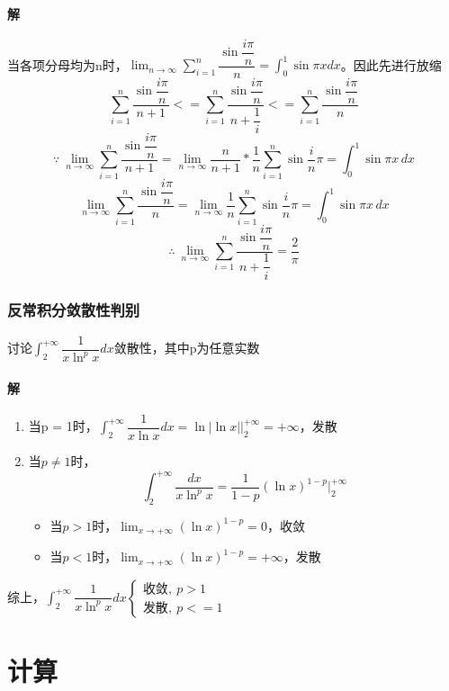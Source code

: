 \paragraph{解}
当各项分母均为n时，\(\displaystyle\lim_{n \to \infty}\sum_{i = 1}^n\dfrac{\sin\dfrac{i\pi}{n}}{n} = \int_0^1\sin\pi xdx\)。因此先进行放缩
\[\sum_{i = 1}^n\dfrac{\sin\dfrac{i\pi}{n}}{n + 1} <= \sum_{i = 1}^n\dfrac{\sin\dfrac{i\pi}{n}}{n + \dfrac{1}{i}} <= \sum_{i = 1}^n\dfrac{\sin\dfrac{i\pi}{n}}{n}\]
\[\because\ \lim_{n \to \infty}\sum_{i = 1}^n\dfrac{\sin\dfrac{i\pi}{n}}{n + 1} = \lim_{n \to \infty}\dfrac{n}{n + 1} * \dfrac{1}{n}\sum_{i = 1}^n\sin\dfrac{i}{n}\pi = \int_0^1\sin\pi x\,dx\]
\[\lim_{n \to \infty}\sum_{i = 1}^n\dfrac{\sin\dfrac{i\pi}{n}}{n} = \lim_{n \to \infty}\dfrac{1}{n}\sum_{i = 1}^n\sin\dfrac{i}{n}\pi = \int_0^1\sin\pi x\,dx\]
\[\therefore\ \lim_{n \to \infty}\sum_{i = 1}^n\dfrac{\sin\dfrac{i\pi}{n}}{n + \dfrac{1}{i}} = \dfrac{2}{\pi}\]


\subsubsection{反常积分敛散性判别}
讨论\(\displaystyle\int_2^{+\infty}\dfrac{1}{x\ln^px}dx\)敛散性，其中p为任意实数

\paragraph{解}
\begin{enumerate}
    \item 当p = 1时，\(\displaystyle\int_2^{+\infty}\dfrac{1}{x\ln x}dx = \ln|\ln x|\bigg|_2^{+\infty} = +\infty\)，发散
    \item 当\(p \neq 1\)时，\[\int_2^{+\infty}\dfrac{dx}{x\ln^px} = \dfrac{1}{1 - p}(\ln x)^{1 - p}\bigg|_2^{+\infty}\]\begin{itemize}
        \item 当\(p > 1\)时，\(\displaystyle\lim_{x \to +\infty}(\ln x)^{1 - p} = 0\)，收敛
        \item 当\(p < 1\)时，\(\displaystyle\lim_{x \to +\infty}(\ln x)^{1 - p} = +\infty\)，发散
    \end{itemize}
\end{enumerate}
综上，\(\displaystyle\int_2^{+\infty}\dfrac{1}{x\ln^px}dx\begin{cases}
    \text{收敛},\ p > 1 \\ 
    \text{发散},\ p <= 1
\end{cases}\)

\section{计算}


